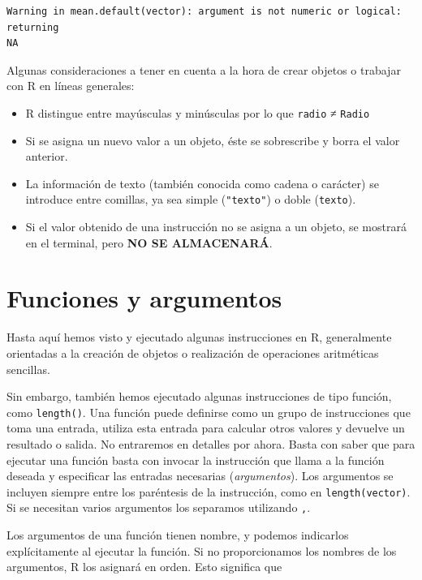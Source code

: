 \documentclass[
  letterpaper,
  DIV=11,
  numbers=noendperiod]{scrreprt}
\providecommand{\tightlist}{%
  \setlength{\itemsep}{0pt}\setlength{\parskip}{0pt}}\usepackage{longtable,booktabs,array}
\begin{document}
\begin{verbatim}
Warning in mean.default(vector): argument is not numeric or logical: returning
NA
\end{verbatim}

Algunas consideraciones a tener en cuenta a la hora de crear objetos o
trabajar con R en líneas generales:

\begin{itemize}
\tightlist
\item
  R distingue entre mayúsculas y minúsculas por lo que \texttt{radio} ≠
  \texttt{Radio}
\item
  Si se asigna un nuevo valor a un objeto, éste se sobrescribe y borra
  el valor anterior.
\item
  La información de texto (también conocida como cadena o carácter) se
  introduce entre comillas, ya sea simple (\texttt{"texto"}) o doble
  (\texttt{\textquotesingle{}texto\textquotesingle{}}).
\item
  Si el valor obtenido de una instrucción no se asigna a un objeto, se
  mostrará en el terminal, pero \textbf{NO SE ALMACENARÁ}.
\end{itemize}

\hypertarget{funciones-y-argumentos}{%
\section{Funciones y argumentos}\label{funciones-y-argumentos}}

Hasta aquí hemos visto y ejecutado algunas instrucciones en R,
generalmente orientadas a la creación de objetos o realización de
operaciones aritméticas sencillas.

Sin embargo, también hemos ejecutado algunas instrucciones de tipo
función, como \texttt{length()}. Una función puede definirse como un
grupo de instrucciones que toma una entrada, utiliza esta entrada para
calcular otros valores y devuelve un resultado o salida. No entraremos
en detalles por ahora. Basta con saber que para ejecutar una función
basta con invocar la instrucción que llama a la función deseada y
especificar las entradas necesarias (\emph{argumentos}). Los argumentos
se incluyen siempre entre los paréntesis de la instrucción, como en
\texttt{length(vector)}. Si se necesitan varios argumentos los separamos
utilizando \texttt{,}.

Los argumentos de una función tienen nombre, y podemos indicarlos
explícitamente al ejecutar la función. Si no proporcionamos los nombres
de los argumentos, R los asignará en orden. Esto significa que
\end{document}
